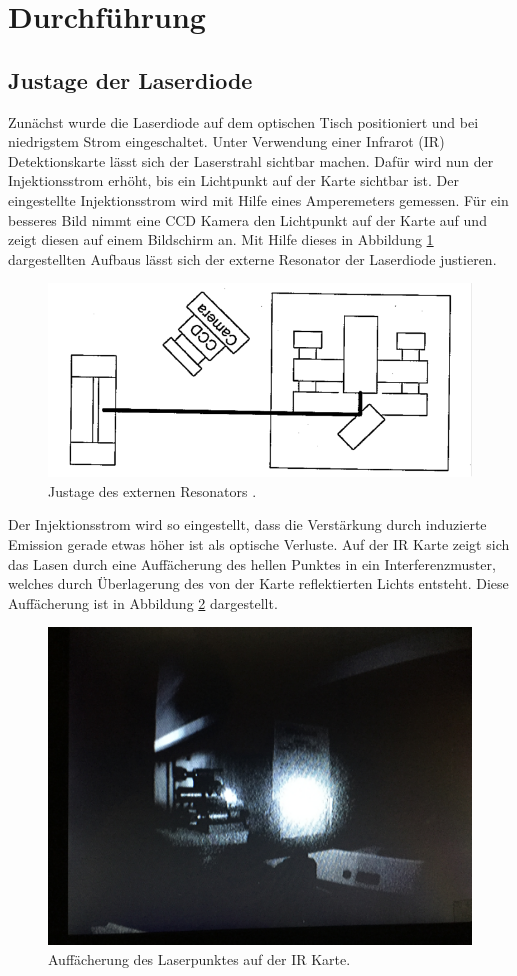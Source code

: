 \newpage
\section{Durchführung}
\label{sec:Durchführung}

\subsection{Justage der Laserdiode}
\label{sec:Justage}

Zunächst wurde die Laserdiode auf dem optischen Tisch positioniert und
bei niedrigstem Strom eingeschaltet.
Unter Verwendung einer Infrarot (IR) Detektionskarte lässt sich der Laserstrahl sichtbar machen.
Dafür wird nun der Injektionsstrom erhöht, bis ein Lichtpunkt auf der Karte sichtbar ist.
Der eingestellte Injektionsstrom wird mit Hilfe eines Amperemeters gemessen.
Für ein besseres Bild nimmt eine CCD Kamera den Lichtpunkt auf der Karte auf und
zeigt diesen auf einem Bildschirm an.
Mit Hilfe dieses in Abbildung \ref{fig:ExternalCavityAlignment} dargestellten Aufbaus
lässt sich der externe Resonator der Laserdiode justieren.

\begin{figure}
	\centering
	\includegraphics[width=.6\textwidth, angle=1, origin=c]{images/ExternalCavityAlignment.pdf}
	\caption{Justage des externen Resonators \cite{anleitung}.}
	\label{fig:ExternalCavityAlignment}
\end{figure}

Der Injektionsstrom wird so eingestellt, dass die Verstärkung durch induzierte
Emission gerade etwas höher ist als optische Verluste.
Auf der IR Karte zeigt sich das Lasen durch eine Auffächerung des hellen Punktes in ein
Interferenzmuster, welches durch Überlagerung des von der Karte reflektierten
Lichts entsteht.
Diese Auffächerung ist in Abbildung \ref{fig:laser-pattern} dargestellt.

\begin{figure}
	\centering
	\includegraphics[width=.5\textwidth]{images/laser-pattern.JPG}
	\caption{Auffächerung des Laserpunktes auf der IR Karte.}
	\label{fig:laser-pattern}
\end{figure}


